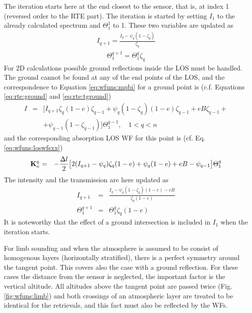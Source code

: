  The iteration starts here at the end closest to the
 sensor, that is, at index 1 (reversed order to the RTE part).  The
 iteration is started by setting $I_1$ to the already calculated
 spectrum and $\Theta^1_1$ to 1.  These two variables are updated as
 \begin{eqnarray}
   I_{q+1} = \frac{I_q - \psi_q(1-\zeta_q)}{\zeta_q} 
 \end{eqnarray}
 \begin{eqnarray}
   \Theta_1^{q+1} =  \Theta_1^q \zeta_q
 \end{eqnarray}
 For 2D calculations possible ground reflections inside the LOS must
 be handled. The ground cannot be found at any of the end points of
 the LOS, and the correspondence to Equation \ref{eq:wfuns:mpbi} for a
 ground point is (c.f. Equations \ref{eq:rte:ground} and
 \ref{eq:rte:tground})
 \begin{eqnarray}
   I &=&\Big[I_{q+1}\zeta_q(1-e)\zeta_{q-1}+\psi_q(1-\zeta_q)(1-e)\zeta_{q-1}
          +eB\zeta_{q-1}+ \nonumber \\
     & & + \psi_{q-1}(1-\zeta_{q-1}) \Big] \Theta^{q-1}_1, \quad 1<q<n 
    \label{eq:wfuns:mpbi_ground}
 \end{eqnarray}
 and the corresponding absorption LOS WF for this point is (cf. Eq.
 \ref{eq:wfuns:loswfsxx})
 \begin{eqnarray}
   \mathbf{K}_{\kappa}^q &=& -\frac{\Delta l}{2} \big[ 2(I_{q+1}-\psi_q)\zeta_q(1-e)+
           \psi_q(1-e)+eB-\psi_{q-1} \big] \Theta^q_1 
 \end{eqnarray}
 The intensity and the transmission are here updated as
 \begin{eqnarray}
   I_{q+1} &=& \frac{I_q-\psi_q(1-\zeta_q)(1-e)-eB}{\zeta_q(1-e)}  \nonumber \\
   \Theta_1^{q+1} &=& \Theta_1^{q}\zeta_q(1-e) \nonumber
 \end{eqnarray}
 It is noteworthy that the effect of a ground intersection is included
 in $I_1$ when the iteration starts.  


 
 \label{sec:wfuns:limb}
    
 For limb sounding and when the atmosphere is assumed to be consist of
 homogenous layers (horizontally stratified), there is a perfect
 symmetry around the tangent point. This covers also the case with a
 ground reflection. For these cases the distance from the sensor is
 neglected, the important factor is the vertical altitude.  All
 altitudes above the tangent point are passed twice (Fig.
 \ref{fig:wfuns:limb}) and both crossings of an atmospheric layer are
 treated to be identical for the retrievals, and this fact must also
 be reflected by the WFs.


